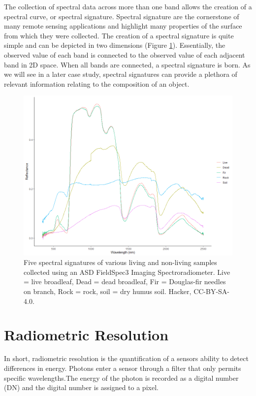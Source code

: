 \documentclass[
]{book}
\begin{document}
The collection of spectral data across more than one band allows the creation of a spectral curve, or spectral signature. Spectral signature are the cornerstone of many remote sensing applications and highlight many properties of the surface from which they were collected. The creation of a spectral signature is quite simple and can be depicted in two dimensions (Figure \ref{fig:11-specsig}). Essentially, the observed value of each band is connected to the observed value of each adjacent band in 2D space. When all bands are connected, a spectral signature is born. As we will see in a later case study, spectral signatures can provide a plethora of relevant information relating to the composition of an object.

\begin{figure}
\includegraphics[width=0.75\linewidth]{images/11-spectralsig} \caption{Five spectral signatures of various living and non-living samples collected using an ASD FieldSpec3 Imaging Spectroradiometer. Live = live broadleaf, Dead = dead broadleaf, Fir = Douglas-fir needles on branch, Rock = rock, soil = dry humus soil. Hacker, CC-BY-SA-4.0.}\label{fig:11-specsig}
\end{figure}

\section{Radiometric Resolution}\label{radiometric-resolution}

In short, radiometric resolution is the quantification of a sensors ability to detect differences in energy. Photons enter a sensor through a filter that only permits specific wavelengths.The energy of the photon is recorded as a digital number (DN) and the digital number is assigned to a pixel.
\end{document}
